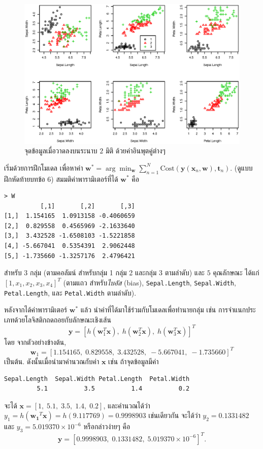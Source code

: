 % 
\begin{figure}
\begin{center}
\includegraphics[width=5.5in]{03Linear/iris6plots.eps}
\end{center}
\caption{จุดข้อมูลเมื่อวาดลงบนระนาบ $2$ มิติ ด้วยค่าอินพุตคู่ต่างๆ}
\label{fig: linear classification iris 2D projections}
\end{figure}
%

เริ่มด้วยการฝึกโมเดล เพื่อหาค่า $\mathbf{w}^* =\arg \min_{\mathbf{w}} \sum_{n=1}^N \mathrm{Cost}(\mathbf{y}(\mathbf{x}_n, \mathbf{w}), \mathbf{t}_n)$. (ดูแบบฝึกหัดท้ายบทข้อ 6)
สมมติค่าพารามิเตอร์ที่ได้ $\mathbf{w}^*$ คือ
\begin{verbatim}
> W
          [,1]       [,2]       [,3]
[1,]  1.154165  1.0913158 -0.4060659
[2,]  0.829558  0.4565969 -2.1633640
[3,]  3.432528 -1.6508103 -1.5221858
[4,] -5.667041  0.5354391  2.9062448
[5,] -1.735660 -1.3257176  2.4796421
\end{verbatim}
สำหรับ $3$ กลุ่ม (ตามคอลัมน์ สำหรับกลุ่ม 1 กลุ่ม 2 และกลุ่ม 3 %
ตามลำดับ) และ $5$ คุณลักษณะ ได้แก่ $[1, x_1, x_2, x_3, x_4]^T$ (ตามแถว สำหรับ\textit{ไบอัส} 
(bias), \texttt{Sepal.Length}, \texttt{Sepal.Width}, \texttt{Petal.Length},
และ \texttt{Petal.Width} ตามลำดับ).

หลังจากได้ค่าพารามิเตอร์ $\mathbf{w}^*$ แล้ว 
นำค่าที่ได้มาใช้ร่วมกับโมเดลเพื่อทำนายกลุ่ม เช่น 
การจำแนกประเภทด้วยโลจิสติกถดถอยกับลักษณะเชิงเส้น
\[
\mathbf{y} = [h(\mathbf{w}_1^T \mathbf{x}), \; h(\mathbf{w}_2^T \mathbf{x}), \; h(\mathbf{w}_3^T \mathbf{x})]^T
\]
โดย จากตัวอย่างข้างต้น,
\[ 
\mathbf{w}_1 = [1.154165,\; 0.829558,\; 3.432528,\; -5.667041,\; -1.735660]^T
\]
เป็นต้น.
ดังนั้นเมื่อนำมาคำนวณกับค่า $\mathbf{x}$ เช่น ถ้าจุดข้อมูลมีค่า
\begin{verbatim}
Sepal.Length  Sepal.Width Petal.Length  Petal.Width 
         5.1          3.5          1.4          0.2 
\end{verbatim}
จะได้ $\mathbf{x} = [1, \; 5.1, \; 3.5, \; 1.4, \; 0.2]$, 
และคำนวณได้ว่า
$y_1 = h( \mathbf{w_1}^T \mathbf{x} ) = h( 9.117769 ) = 0.9998903$
เช่นเดียวกัน 
จะได้ว่า $y_2 = 0.1331482$ 
และ $y_3 = 5.019370 \times 10^{-6}$ 
หรือกล่าวง่ายๆ คือ
\[
\mathbf{y} = [0.9998903,\; 0.1331482,\; 5.019370 \times 10^{-6}]^T.
\]

